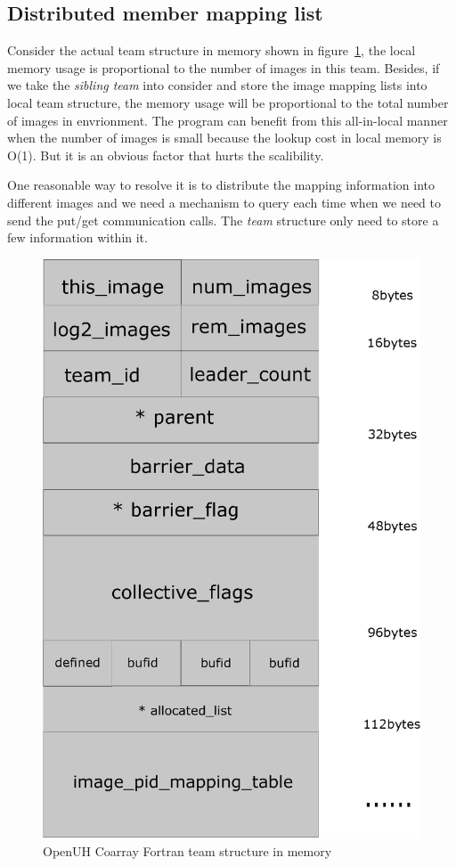 \subsection{Distributed member mapping list}
Consider the actual team structure in memory shown in figure~\ref{fig:teams-structure}, the local memory usage is proportional to the number of images in this team. Besides, if we take the \textit{sibling team} into consider and store the image mapping lists into local team structure, the memory usage will be proportional to the total number of images in envrionment. The program can benefit from this all-in-local manner when the number of images is small because the lookup cost in local memory is O(1). But it is an obvious factor that hurts the scalibility. 

One reasonable way to resolve it is to distribute the mapping information into different images and we need a mechanism to query each time when we need to send the put/get communication calls. The \textit{team} structure only need to store a few information within it.

\begin{figure}[H]
\centering
\includegraphics[scale=0.58]{figures/team_structure.eps}
\caption{OpenUH Coarray Fortran team structure in memory}
\label{fig:teams-structure}
\end{figure}

